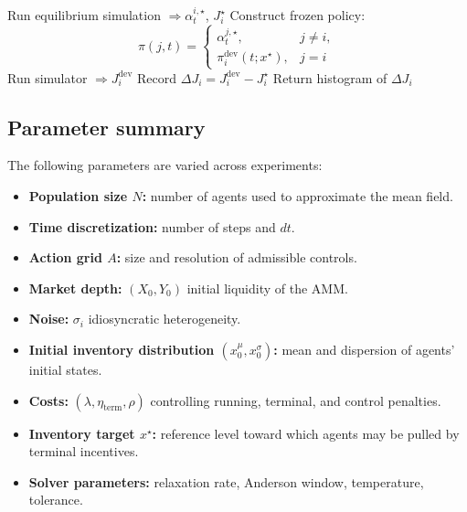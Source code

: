 \documentclass[11pt]{article}
\theoremstyle{definition}
\begin{document}
\begin{algorithm}[H]
\caption{$\epsilon$–Nash unilateral deviation test}
\begin{algorithmic}[1]
\State Run equilibrium simulation $\Rightarrow \alpha^{i,\star}_t$, $J_i^\star$
        \State Construct frozen policy:
        \[
        \pi(j,t)=
        \begin{cases}
        \alpha^{j,\star}_t, & j\neq i,\\
        \pi^{\mathrm{dev}}_{i}(t;x^\star), & j=i
        \end{cases}
        \]
        \State Run simulator $\Rightarrow J_i^{\mathrm{dev}}$
        \State Record $\Delta J_i = J_i^{\mathrm{dev}} - J_i^\star$
    \EndFor
\EndFor
\State Return histogram of $\Delta J_i$
\end{algorithmic}
\end{algorithm}

\subsection*{Parameter summary}

The following parameters are varied across experiments:

\begin{itemize}
    \item \textbf{Population size $N$:} number of agents used to approximate the mean field.
    \item \textbf{Time discretization:} number of steps and $dt$.
    \item \textbf{Action grid $A$:} size and resolution of admissible controls.
    \item \textbf{Market depth:} $(X_0,Y_0)$ initial liquidity of the AMM.
    \item \textbf{Noise:} $\sigma_i$ idiosyncratic heterogeneity.
    \item \textbf{Initial inventory distribution $(x_0^\mu, x_0^\sigma)$:} mean and dispersion of agents’ initial states.
    \item \textbf{Costs:} $(\lambda, \eta_{\mathrm{term}}, \rho)$ controlling running, terminal, and control penalties.
    \item \textbf{Inventory target $x^\star$:} reference level toward which agents may be pulled by terminal incentives.
    \item \textbf{Solver parameters:} relaxation rate, Anderson window, temperature, tolerance.
\end{itemize}
\end{document}
